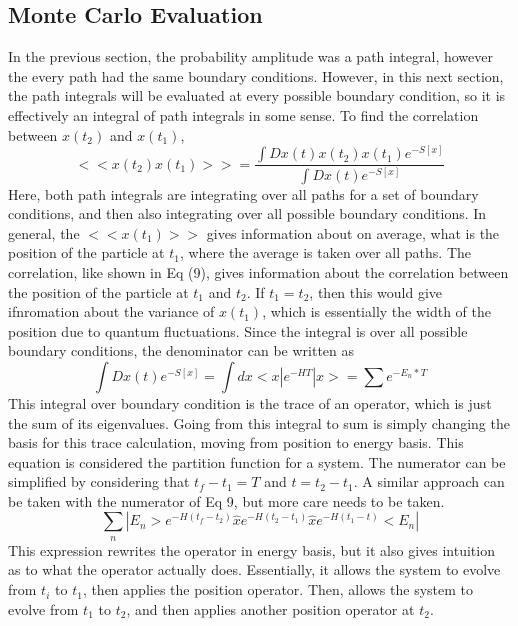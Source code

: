 \documentclass{article}
\begin{document}
\subsection{Monte Carlo Evaluation}
In the previous section, the probability amplitude was a path integral, however the every path had the same boundary conditions.
However, in this next section, the path integrals will be evaluated at every possible boundary condition, so it is effectively an integral of path integrals in some sense.
To find the correlation between $x(t_2)$ and $x(t_1)$, 
\begin{equation}
<<x(t_2)x(t_1)>> = \frac{\int Dx(t) x(t_2)x(t_1)e^{-S[x]}}{\int Dx(t) e^{-S[x]}}
\end{equation}
Here, both path integrals are integrating over all paths for a set of boundary conditions, and then also integrating over all possible boundary conditions.
In general, the $<<x(t_1)>>$ gives information about on average, what is the position of the particle at $t_1$, where the average is taken over all paths.
The correlation, like shown in Eq (9), gives information about the correlation between the position of the particle at $t_1$ and $t_2$. If $t_1 = t_2$, then 
this would give ifnromation about the variance of $x(t_1)$, which is essentially the width of the position due to quantum fluctuations.
Since the integral is over all possible boundary conditions, the denominator can be written as
\begin{equation}
    \int Dx(t) e^{-S[x]} = \int dx <x|e^{-HT}|x> = \sum e^{-E_n*T}
\end{equation}
This integral over boundary condition is the trace of an operator, which is just the sum of its eigenvalues. 
Going from this integral to sum is simply changing the basis for this trace calculation, moving from position to energy basis.
This equation is considered the partition function for a system.
The numerator can be simplified by considering that $t_f - t_1 = T$ and $t = t_2 - t_1$.
A similar approach can be taken with the numerator of Eq 9, but more care needs to be taken. \newline
\begin{equation}
    \sum_n |E_n>e^{-H(t_f - t_2)}\hat{x}e^{-H(t_2 - t_1)}\hat{x}e^{-H(t_1 - t)}<E_n|
\end{equation}
This expression rewrites the operator in energy basis, but it also gives intuition as to what the operator actually does.
Essentially, it allows the system to evolve from $t_i$ to $t_1$, then applies the position operator. 
Then, allows the system to evolve from $t_1$ to $t_2$, and then applies another position operator at $t_2$. 
\end{document}
